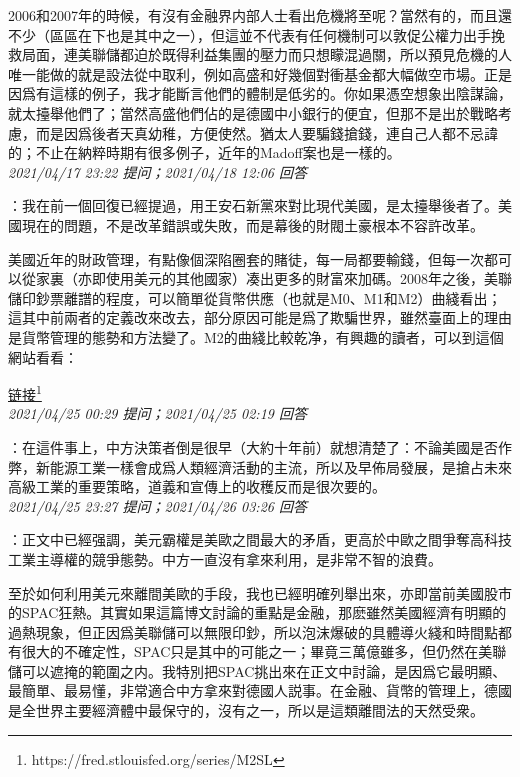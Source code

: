 \documentclass[twocolumn]{ctexart}
\begin{document}
2006和2007年的時候，有沒有金融界内部人士看出危機將至呢？當然有的，而且還不少（區區在下也是其中之一），但這並不代表有任何機制可以敦促公權力出手挽救局面，連美聯儲都迫於既得利益集團的壓力而只想矇混過關，所以預見危機的人唯一能做的就是設法從中取利，例如高盛和好幾個對衝基金都大幅做空市場。正是因爲有這樣的例子，我才能斷言他們的體制是低劣的。你如果憑空想象出陰謀論，就太擡舉他們了；當然高盛他們佔的是德國中小銀行的便宜，但那不是出於戰略考慮，而是因爲後者天真幼稚，方便使然。猶太人要騙錢搶錢，連自己人都不忌諱的；不止在納粹時期有很多例子，近年的Madoff案也是一樣的。
\\

\textit{\hfill\noindent\small 2021/04/17 23:22 提问；2021/04/18 12:06 回答}

：我在前一個回復已經提過，用王安石新黨來對比現代美國，是太擡舉後者了。美國現在的問題，不是改革錯誤或失敗，而是幕後的財閥土豪根本不容許改革。

美國近年的財政管理，有點像個深陷圈套的賭徒，每一局都要輸錢，但每一次都可以從家裏（亦即使用美元的其他國家）凑出更多的財富來加碼。2008年之後，美聯儲印鈔票離譜的程度，可以簡單從貨幣供應（也就是M0、M1和M2）曲綫看出；這其中前兩者的定義改來改去，部分原因可能是爲了欺騙世界，雖然臺面上的理由是貨幣管理的態勢和方法變了。M2的曲綫比較乾净，有興趣的讀者，可以到這個網站看看：

\href{https://fred.stlouisfed.org/series/M2SL}{链接\footnote{\url{https://fred.stlouisfed.org/series/M2SL}}}
\\

\textit{\hfill\noindent\small 2021/04/25 00:29 提问；2021/04/25 02:19 回答}

：在這件事上，中方決策者倒是很早（大約十年前）就想清楚了：不論美國是否作弊，新能源工業一樣會成爲人類經濟活動的主流，所以及早佈局發展，是搶占未來高級工業的重要策略，道義和宣傳上的收穫反而是很次要的。
\\

\textit{\hfill\noindent\small 2021/04/25 23:27 提问；2021/04/26 03:26 回答}

：正文中已經强調，美元霸權是美歐之間最大的矛盾，更高於中歐之間爭奪高科技工業主導權的競爭態勢。中方一直沒有拿來利用，是非常不智的浪費。

至於如何利用美元來離間美歐的手段，我也已經明確列舉出來，亦即當前美國股市的SPAC狂熱。其實如果這篇博文討論的重點是金融，那麽雖然美國經濟有明顯的過熱現象，但正因爲美聯儲可以無限印鈔，所以泡沫爆破的具體導火綫和時間點都有很大的不確定性，SPAC只是其中的可能之一；畢竟三萬億雖多，但仍然在美聯儲可以遮掩的範圍之内。我特別把SPAC挑出來在正文中討論，是因爲它最明顯、最簡單、最易懂，非常適合中方拿來對德國人説事。在金融、貨幣的管理上，德國是全世界主要經濟體中最保守的，沒有之一，所以是這類離間法的天然受衆。
\\
\end{document}
